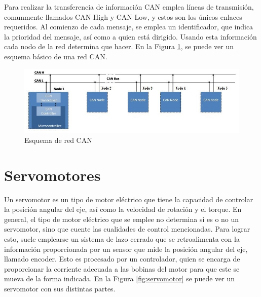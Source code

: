 Para realizar la transferencia de información CAN emplea líneas de transmisión, comunmente llamados CAN High y CAN Low, y estos son los únicos enlaces requeridos. Al comienzo de cada mensaje, se emplea un identificador, que indica la prioridad del mensaje, así como a quien está dirigido. Usando esta información cada nodo de la red determina que hacer. En la Figura \ref{fig:canBus}, se puede ver un esquema básico de una red CAN.


\begin{figure}[htbp]
	\centering
	\includegraphics[scale=.6]{./Figures/CANBUS-Esquema.jpg}
	\caption{Esquema de red CAN\protect\footnotemark}
	\label{fig:canBus}
\end{figure}


\section{Servomotores}

Un servomotor\citep{Industrial_Automation_Hands_On} es un tipo de motor eléctrico que tiene la capacidad de controlar la posición angular del eje, así como la velocidad de rotación y el torque. En general, el tipo de motor eléctrico que se emplee no determina si es o no un servomotor, sino que cuente las cualidades de control mencionadas. Para lograr esto, suele emplearse un sistema de lazo cerrado que se retroalimenta con la información proporcionada por un sensor que mide la posición angular del eje, llamado encoder. Esto es procesado por un controlador, quien se encarga de proporcionar la corriente adecuada a las bobinas del motor para que este se mueva de la forma indicada. En la Figura \ref{fig:servomotor} se puede ver un servomotor con sus distintas partes.

